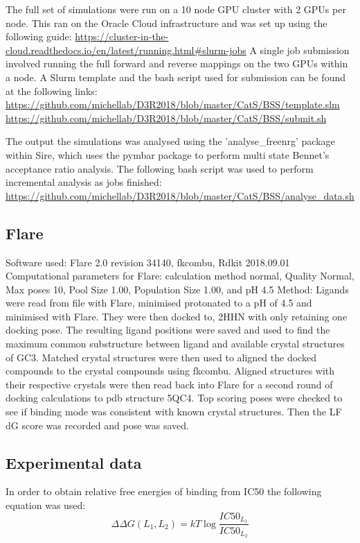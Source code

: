 \documentclass[9pt,comparison]{livecoms}
\begin{document}
The full set of simulations were run on a 10 node GPU cluster with 2
GPUs per node. This ran on the Oracle Cloud infrastructure and was set up
using the following guide:
\url{https://cluster-in-the-cloud.readthedocs.io/en/latest/running.html#slurm-jobs}
A single job submission involved running the full forward
and reverse mappings on the two GPUs within a node. A Slurm template and
the bash script used for submission can be found at the following links:
\url{https://github.com/michellab/D3R2018/blob/master/CatS/BSS/template.slm}
\url{https://github.com/michellab/D3R2018/blob/master/CatS/BSS/submit.sh}

The output the simulations was analysed using the 'analyse\_freenrg'
package within Sire, which uses the pymbar package to perform multi
state Bennet's acceptance ratio analysis. The following bash script
was used to perform incremental analysis as jobs finished:
\url{https://github.com/michellab/D3R2018/blob/master/CatS/BSS/analyse_data.sh}

\subsection{Flare}
Software used: Flare 2.0 revision 34140, fkcombu, Rdkit 2018.09.01
Computational parameters for Flare: calculation method normal, Quality Normal, Max poses 10, Pool Size 1.00, Population Size 1.00, and pH 4.5
Method: Ligands were read from file with Flare, minimised protonated to a pH of 4.5 and minimised with Flare. They were then docked to, 2HHN with only retaining one docking pose. The resulting ligand positions were saved and used to find the maximum common substructure between ligand and available crystal structures of GC3. Matched crystal structures were then used to aligned the docked compounds to the crystal compounds using fkcombu. Aligned structures with their respective crystals were then read back into Flare for a second round of docking calculations to pdb structure 5QC4. Top scoring poses were checked to see if binding mode was consistent with known crystal structures. Then the LF dG score was recorded and pose was saved.
\subsection{Experimental data}
In order to obtain relative free energies of binding from IC50 the following equation was used:
\begin{equation}
\Delta\Delta G(L_1, L_2) = kT \log \frac{IC50_{L_1}}{IC50_{L_2}}
\end{equation}
\end{document}
